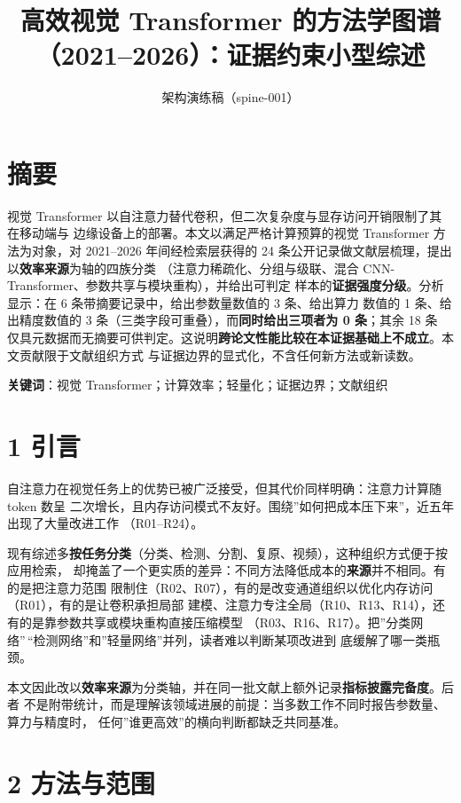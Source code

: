\documentclass[
  chinese,
]{article}
\title{高效视觉 Transformer
的方法学图谱（2021--2026）：证据约束小型综述}
\subtitle{架构演练稿（spine-001）}
\author{}
\date{}
\begin{document}
\maketitle

\section{摘要}\label{ux6458ux8981}

视觉 Transformer
以自注意力替代卷积，但二次复杂度与显存访问开销限制了其在移动端与
边缘设备上的部署。本文以满足严格计算预算的视觉 Transformer
方法为对象，对 2021--2026 年间经检索层获得的 24
条公开记录做文献层梳理，提出以\textbf{效率来源}为轴的四族分类
（注意力稀疏化、分组与级联、混合
CNN-Transformer、参数共享与模块重构），并给出可判定
样本的\textbf{证据强度分级}。分析显示：在 6
条带摘要记录中，给出参数量数值的 3 条、给出算力 数值的 1
条、给出精度数值的 3 条（三类字段可重叠），而\textbf{同时给出三项者为 0
条}；其余 18 条
仅具元数据而无摘要可供判定。这说明\textbf{跨论文性能比较在本证据基础上不成立}。本文贡献限于文献组织方式
与证据边界的显式化，不含任何新方法或新读数。

\textbf{关键词}：视觉 Transformer；计算效率；轻量化；证据边界；文献组织

\section{1 引言}\label{ux5f15ux8a00}

自注意力在视觉任务上的优势已被广泛接受，但其代价同样明确：注意力计算随
token 数呈
二次增长，且内存访问模式不友好。围绕''如何把成本压下来''，近五年出现了大量改进工作
（R01--R24）。

现有综述多\textbf{按任务分类}（分类、检测、分割、复原、视频），这种组织方式便于按应用检索，
却掩盖了一个更实质的差异：不同方法降低成本的\textbf{来源}并不相同。有的是把注意力范围
限制住（R02、R07），有的是改变通道组织以优化内存访问（R01），有的是让卷积承担局部
建模、注意力专注全局（R10、R13、R14），还有的是靠参数共享或模块重构直接压缩模型
（R03、R16、R17）。把''分类网络''\,``检测网络''和''轻量网络''并列，读者难以判断某项改进到
底缓解了哪一类瓶颈。

本文因此改以\textbf{效率来源}为分类轴，并在同一批文献上额外记录\textbf{指标披露完备度}。后者
不是附带统计，而是理解该领域进展的前提：当多数工作不同时报告参数量、算力与精度时，
任何''谁更高效''的横向判断都缺乏共同基准。

\section{2 方法与范围}\label{ux65b9ux6cd5ux4e0eux8303ux56f4}
\end{document}
